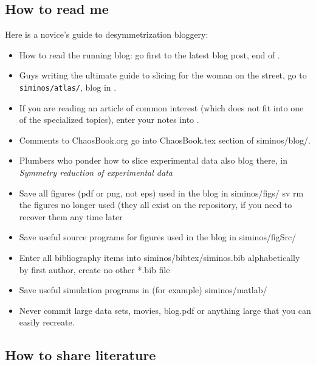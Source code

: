 

\subsection{How to read me}

Here is a novice's guide to desymmetrization bloggery:
\begin{itemize}
  \item
How to read the running blog: go first to the latest blog post, end
of .
  \item
Guys writing the ultimate guide to slicing for the woman on the street,
go to \texttt{siminos/atlas/}, blog in .
  \item
If you are reading an article of common interest (which does not fit into
one of the specialized topics), enter your notes into .
  \item
Comments to ChaosBook.org go into ChaosBook.tex section of siminos/blog/.
  \item
Plumbers who ponder how to slice experimental data also blog there,  in
 {\em Symmetry reduction of experimental data}
  \item
Save all figures (pdf or png, not eps) used in the blog in siminos/figs/
sv rm the figures no longer used (they all exist on the repository, if
you need to recover them any time later
  \item
Save useful source programs for figures used in the blog in siminos/figSrc/
  \item
Enter all bibliography items into siminos/bibtex/siminos.bib alphabetically by
first author, create no other *.bib file
  \item
Save useful simulation programs  in (for example) siminos/matlab/
  \item
Never commit large data sets, movies, blog.pdf or anything large that you
can easily recreate.


\end{itemize}

\subsection{How to share literature}
\label{s:HowToLit}


